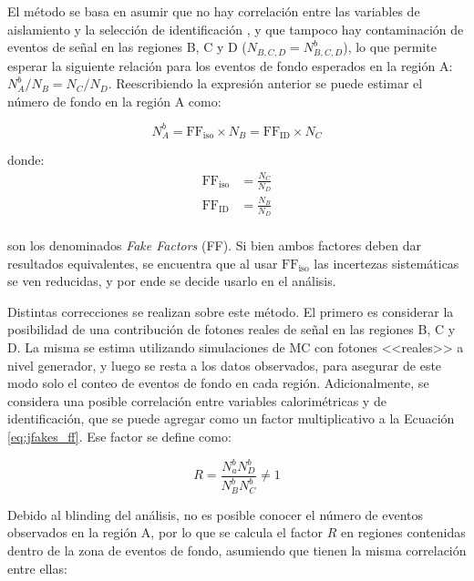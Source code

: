 El método se basa en asumir que no hay correlación entre las variables de aislamiento y la selección de identificación \cite{tesis_tony}, y que tampoco hay contaminación de eventos de señal en las regiones B, C y D ($N_{B,C,D}=N_{B,C,D}^b$), lo que permite esperar la siguiente relación para los eventos de fondo esperados en la región A: $N_A^b / N_B = N_C/N_D$. 
Reescribiendo la expresión anterior se puede estimar el número de fondo en la región A como:

\begin{equation}
  N_A^b = \text{FF}_{\text{iso}}\times N_B = \text{FF}_{\text{ID}}\times N_C
  \label{eq:jfakes_ff}
\end{equation}

\noindent
donde:
\begin{equation}
  \begin{split}
    \text{FF}_{\text{iso}} &= \frac{N_C}{N_D} \\
    \text{FF}_{\text{ID}} &= \frac{N_B}{N_D} \\
  \end{split}
\end{equation}

\noindent
son los denominados \textit{Fake Factors} (FF). 
Si bien ambos factores deben dar resultados equivalentes, se encuentra que al usar $\text{FF}_{\text{iso}}$ las incertezas sistemáticas se ven reducidas, y por ende se decide usarlo en el análisis.

Distintas correcciones se realizan sobre este método. El primero es considerar la posibilidad de una contribución de fotones reales de señal en las regiones B, C y D. La misma se estima utilizando simulaciones de MC con fotones <<reales>> a nivel generador, y luego se resta a los datos observados, para asegurar de este modo solo el conteo de eventos de fondo en cada región. Adicionalmente, se considera una posible correlación entre variables calorimétricas y de identificación, que se puede agregar como un factor multiplicativo a la Ecuación \ref{eq:jfakes_ff}. Ese factor se define como:

\begin{equation}
  R = \frac{N_a^b N_D^b}{N_B^b N_C^b} \neq 1
\end{equation}

Debido al blinding del análisis, no es posible conocer el número de eventos observados en la región A, por lo que se calcula el factor $R$ en regiones contenidas dentro de la zona de eventos de fondo, asumiendo que tienen la misma correlación entre ellas:

